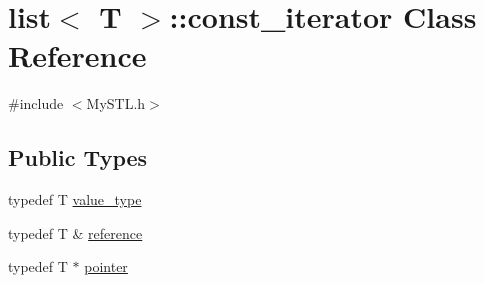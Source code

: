 \section{list$<$ T $>$::const\_\-iterator Class Reference}
\label{classlist_1_1const__iterator}


{\ttfamily \#include $<$MySTL.h$>$}

\subsection*{Public Types}
\begin{DoxyCompactItemize}
\item 
typedef T \hyperlink{classlist_1_1const__iterator_a5588973ab78dd8bc590764095982d56e}{value\_\-type}
\item 
typedef T \& \hyperlink{classlist_1_1const__iterator_ad4af4d92e40fe0a31c4a8911199aee89}{reference}
\item 
typedef T $\ast$ \hyperlink{classlist_1_1const__iterator_a25945664ce22d7fb6211f0f8b84ed23f}{pointer}
\end{DoxyCompactItemize}
